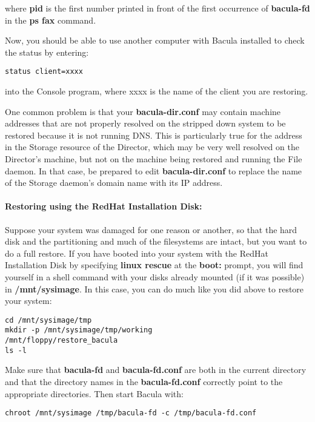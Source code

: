where {\bf pid} is the first number printed in front of the first occurrence
of {\bf bacula-fd} in the {\bf ps fax} command. 

Now, you should be able to use another computer with Bacula installed to check
the status by entering: 

\footnotesize
\begin{verbatim}
status client=xxxx
\end{verbatim}
\normalsize

into the Console program, where xxxx is the name of the client you are
restoring. 

One common problem is that your {\bf bacula-dir.conf} may contain machine
addresses that are not properly resolved on the stripped down system to be
restored because it is not running DNS. This is particularly true for the
address in the Storage resource of the Director, which may be very well
resolved on the Director's machine, but not on the machine being restored and
running the File daemon. In that case, be prepared to edit {\bf
bacula-dir.conf} to replace the name of the Storage daemon's domain name with
its IP address. 

\paragraph*{Restoring using the RedHat Installation Disk:}

Suppose your system was damaged for one reason or another, so that the hard
disk and the partitioning and much of the filesystems are intact, but you want
to do a full restore. If you have booted into your system with the RedHat
Installation Disk by specifying {\bf linux rescue} at the {\bf boot:} prompt,
you will find yourself in a shell command with your disks already mounted (if
it was possible) in {\bf /mnt/sysimage}. In this case, you can do much like
you did above to restore your system: 

\footnotesize
\begin{verbatim}
cd /mnt/sysimage/tmp
mkdir -p /mnt/sysimage/tmp/working
/mnt/floppy/restore_bacula
ls -l
\end{verbatim}
\normalsize

Make sure that {\bf bacula-fd} and {\bf bacula-fd.conf} are both in the
current directory and that the directory names in the {\bf bacula-fd.conf}
correctly point to the appropriate directories. Then start Bacula with: 

\footnotesize
\begin{verbatim}
chroot /mnt/sysimage /tmp/bacula-fd -c /tmp/bacula-fd.conf
\end{verbatim}
\normalsize

